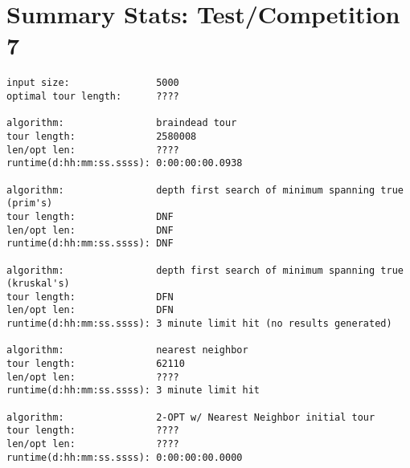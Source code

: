 \documentclass[12pt]{article}
\begin{document}
\newpage
\section*{Summary Stats: Test/Competition 7}
\begin{verbatim}
input size:               5000
optimal tour length:      ????

algorithm:                braindead tour
tour length:              2580008
len/opt len:              ????
runtime(d:hh:mm:ss.ssss): 0:00:00:00.0938

algorithm:                depth first search of minimum spanning true (prim's) 
tour length:              DNF
len/opt len:              DNF
runtime(d:hh:mm:ss.ssss): DNF

algorithm:                depth first search of minimum spanning true (kruskal's) 
tour length:              DFN
len/opt len:              DFN
runtime(d:hh:mm:ss.ssss): 3 minute limit hit (no results generated)

algorithm:                nearest neighbor 
tour length:              62110
len/opt len:              ????
runtime(d:hh:mm:ss.ssss): 3 minute limit hit

algorithm:                2-OPT w/ Nearest Neighbor initial tour
tour length:              ????
len/opt len:              ????
runtime(d:hh:mm:ss.ssss): 0:00:00:00.0000
\end{verbatim}

\newpage
\printbibliography
\end{document}
